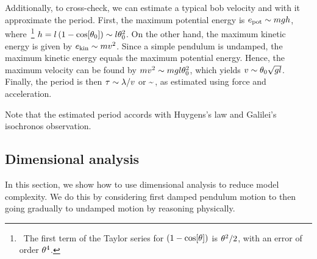 Additionally, to cross-check, we can estimate a typical bob velocity and with it approximate the period. First, the maximum potential energy is $e_\text{pot}\sim mgh$, where~\footnote{~The first term of the Taylor series for $\left(1 - \cos\!\left[{\theta}\right]\right)$ is $\theta^2/2$, with an error of order $\theta^4$.} $h = l\left(1 - \cos\!\left[{\theta_0}\right]\right)\sim l\theta_0^2$. On the other hand, the maximum kinetic energy is given by $e_\text{kin}\sim mv^2$. Since a simple pendulum is undamped, the maximum kinetic energy equals the maximum potential energy. Hence, the maximum velocity can be found by $mv^2\sim mgl\theta_0^2$, which yields $v\sim\theta_0\sqrt{gl}$. Finally, the period is then $\tau\sim\lambda/v$ or
\beq
\oscper\sim\sqrt{\dfrac{\length}{\grav}}\,,
\eeq 
as estimated using force and acceleration. 

Note that the estimated period accords with Huygens's law and Galilei's isochronos observation.


\subsection{Dimensional analysis}\label{subsec:dimanalysisorderofmag}
In this section, we show how to use dimensional analysis to reduce model complexity. We do this by considering first damped pendulum motion to then going gradually to undamped motion by reasoning physically.


